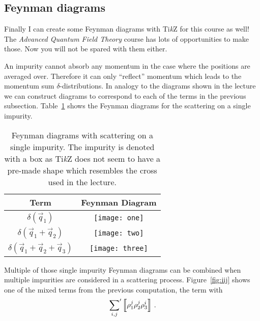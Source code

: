 \documentclass[11pt, english, fleqn, DIV=15, headinclude, BCOR=1cm]{scrartcl}
\newcommand\Ensemble[1]{\left\llbracket #1 \right\rrbracket}
\newcommand\sump{\sideset{}{'}\sum}
\begin{document}
\subsection{Feynman diagrams}

Finally I can create some Feynman diagrams with Ti\emph{k}Z for this course as
well! \Laughey The \emph{Advanced Quantum Field Theory} course has lots of
opportunities to make those. Now you will not be spared with them either.
\Winkey

An impurity cannot absorb any momentum in the case where the positions are
averaged over. Therefore it can only “reflect” momentum which leads to the
momentum sum $\delta$-distributions. In analogy to the diagrams shown in the
lecture we can construct diagrams to correspond to each of the terms in the
previous subsection. Table~\ref{tab:single} shows the Feynman diagrams for the
scattering on a single impurity.

\begin{table}
    \centering
    \begin{tabular}{cc}
        \toprule
        Term & Feynman Diagram \\
        \midrule
        $\delta(\vec q_1)$ & \texttt{[image: one]} \\
        \midrule
        $\delta(\vec q_1 + \vec q_2)$ & \texttt{[image: two]} \\
        \midrule
        $\delta(\vec q_1 + \vec q_2 + \vec q_3)$ & \texttt{[image: three]} \\
        \bottomrule
    \end{tabular}
    \caption{%
        Feynman diagrams with scattering on a single impurity. The impurity is
        denoted with a box as Ti\emph{k}Z does not seem to have a pre-made
        shape which resembles the cross used in the lecture.
    }
    \label{tab:single}
\end{table}

Multiple of those single impurity Feynman diagrams can be combined when
multiple impurities are considered in a scattering process.
Figure~\ref{fig:iij} shows one of the mixed terms from the previous
computation, the term with
\[
    \sump_{i, j} \Ensemble{\rho_1^j \rho_2^j \rho_3^i} \,.
\]
\end{document}
